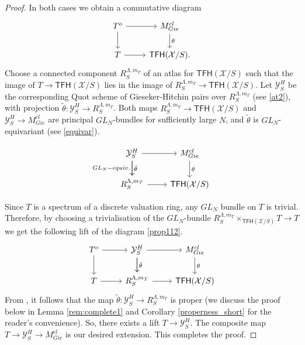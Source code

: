 \documentclass[11pt]{amsart}
\newcommand {\TFH} {\mathsf{TFH}}
\theoremstyle{plain}
\numberwithin{equation}{section}
\theoremstyle{definition}
\theoremstyle{plain}
\begin{document}
\begin{proof}
\medskip

In both cases we obtain a commutative diagram
 \begin{equation}\label{prop112}
\begin{tikzcd}
T^o\arrow{r} \arrow{d} &M^{cl}_{Gie}\arrow["\theta"]{d}\\
T\arrow{r}& \TFH(\mathcal X/S).
\end{tikzcd}
\end{equation}
Choose a connected component $  R^{\Lambda, m_T}_S  $ of an atlas for $  \TFH(\mathcal{X}/S)  $ such that the image of $  T \to \TFH(\mathcal{X}/S)  $ lies in the image of $  R^{\Lambda, m_T}_S \to \TFH(\mathcal{X}/S)  $. Let $  \mathcal{Y}^H_S  $ be the corresponding Quot scheme of Gieseker-Hitchin pairs over $  R^{\Lambda, m_T}_S  $ (see \ref{at2}), with projection $  \tilde{\theta} \colon \mathcal{Y}^H_S \to R^{\Lambda, m_T}_S  $.
Both maps $  R^{\Lambda, m_T}_S \to \TFH(\mathcal{X}/S)  $ and $  \mathcal{Y}^H_S \to M^{cl}_{Gie}  $ are principal $  GL_N  $-bundles for sufficiently large $  N  $, and $  \tilde{\theta}  $ is $  GL_N  $-equivariant (see \ref{equivar}). 

 \begin{equation}
\begin{tikzcd}
\mathcal Y^H_S\arrow["\tilde{\theta}"]{d}[swap]{GL_N-equiv.}\arrow[]{r} \arrow{d} & M^{cl}_{Gie}\arrow["\theta"]{d}\\
 R^{\Lambda, m_T}_S \arrow[]{r} & \TFH(\mathcal X/S)
\end{tikzcd}
\end{equation}

Since $T$ is a spectrum of a discrete valuation ring, any $GL_N$ bundle on $T$ is trivial. Therefore, by choosing a trivialisation of the $GL_N$-bundle $R^{\Lambda, m_T}_S\times_{\TFH(\mathcal X/S)} T\to T$ we get the following lift of the diagram \ref{prop112}.
\begin{equation}
\begin{tikzcd}
T^o\arrow{r} \arrow{d} & \mathcal Y^H_S\arrow["\tilde{\theta}"]{d}\arrow{r} \arrow{d} & M^{cl}_{Gie}\arrow["\theta"]{d}\\
T\arrow{r}& R^{\Lambda, m_T}_S \arrow{r} & \TFH(\mathcal X/S)
\end{tikzcd}
\end{equation}
From \cite[Proposition 5.11]{2a}, it follows that the map $\tilde{\theta}: \mathcal Y^H_S\longrightarrow R^{\Lambda, m_T}_S$ is proper (we discuss the proof below in Lemma \ref{rem:complete1} and Corollary \ref{properness_short} for the reader's convenience). So, there exists a lift $T\longrightarrow \mathcal Y^H_S$. The composite map $T\longrightarrow \mathcal Y^H_S\longrightarrow M^{cl}_{Gie}$ is our desired extension. 
This completes the proof.
\end{proof}
\end{document}
